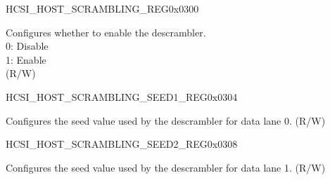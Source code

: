 \begin{register}{H}{CSI\_HOST\_SCRAMBLING\_REG}{0x0300}\label{regdesc:CSIHOSTSCRAMBLINGREG}
%
%
\regnewline%
\begin{regdesc}\begin{reglist}
\label{fielddesc:CSIHOSTSCRAMBLEENABLE}\item [CSI\_HOST\_SCRAMBLE\_ENABLE] Configures whether to enable the descrambler.\\
0: Disable\\
1: Enable\\
(R/W)
\end{reglist}\end{regdesc}
\end{register}


\begin{register}{H}{CSI\_HOST\_SCRAMBLING\_SEED1\_REG}{0x0304}\label{regdesc:CSIHOSTSCRAMBLINGSEED1REG}
%
%
\regnewline%
\begin{regdesc}\begin{reglist}
\label{fielddesc:CSIHOSTSCRAMBLESEEDLANEN}\label{fielddesc:CSIHOSTSCRAMBLESEEDLANE1}\item [CSI\_HOST\_SCRAMBLE\_SEED\_LANE1] Configures the seed value used by the descrambler for data lane 0. (R/W)
\end{reglist}\end{regdesc}
\end{register}


\begin{register}{H}{CSI\_HOST\_SCRAMBLING\_SEED2\_REG}{0x0308}\label{regdesc:CSIHOSTSCRAMBLINGSEED2REG}
%
%
\regnewline%
\begin{regdesc}\begin{reglist}
\label{fielddesc:CSIHOSTSCRAMBLESEEDLANE2}\item [CSI\_HOST\_SCRAMBLE\_SEED\_LANE2] Configures the seed value used by the descrambler for data lane 1. (R/W)
\end{reglist}\end{regdesc}
\end{register}


